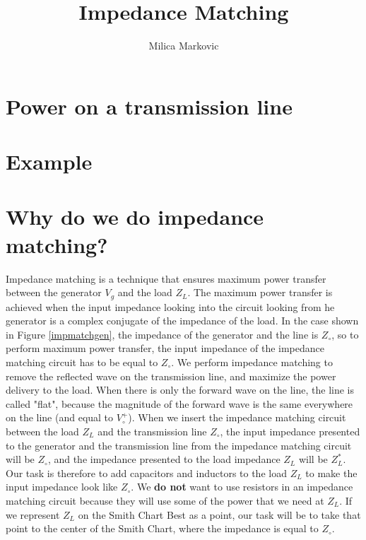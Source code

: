 \documentclass{ximera}
\title{Impedance Matching}
\author{Milica Markovic}
\begin{document}
  
\begin{abstract}  

\end{abstract}  
\maketitle    

\section{Power on a transmission line}


\section{Example }

\section{Why do we do impedance matching?}



Impedance matching is a technique that ensures maximum power transfer between the generator $V_g$ and the load $Z_L$. The maximum power transfer is achieved when the input impedance looking into the circuit looking from he generator is a complex conjugate of the impedance of the load. In the case shown in Figure \ref{impmatchgen}, the impedance of the generator and the line is $Z_\circ$, so to perform maximum power transfer, the input impedance of the impedance matching circuit has to be equal to $Z_\circ$.
We perform impedance matching to remove the reflected wave on the transmission line, and maximize the power delivery to the load. When there is only the forward wave on the line, the line is called "flat", because the magnitude of the forward wave is the same everywhere on the line (and equal to $V_\circ^+$).  When we insert the impedance matching circuit between the load $Z_L$ and the transmission line $Z_\circ$, the input impedance presented to the generator and the transmission line from the impedance matching circuit will be $Z_\circ$, and the impedance presented to the load impedance $Z_L$ will be $Z_L^*$. Our task is therefore to add capacitors and inductors to the load $Z_L$ to make the input impedance look like $Z_\circ$. We {\bf do not} want to use resistors in an impedance matching circuit because they will use some of the power that we need at $Z_L$.  If we represent $Z_L$ on the Smith Chart Best as a point, our task will be to take that point to the center of the Smith Chart, where the impedance is equal to $Z_\circ$. 
\end{document}
